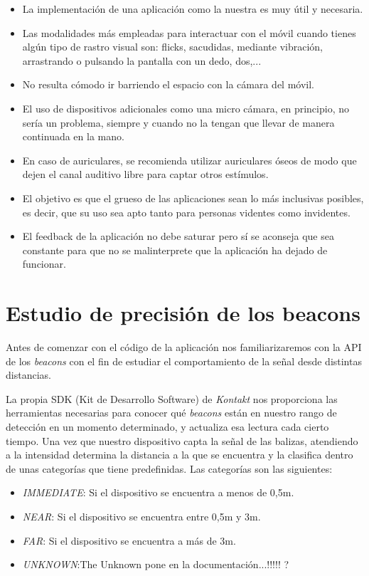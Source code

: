 \begin{itemize}
	\item La implementación de una aplicación como la nuestra es muy útil y necesaria.
	\item Las modalidades más empleadas para interactuar con el móvil cuando tienes algún tipo de rastro visual son: flicks, sacudidas, mediante vibración, arrastrando o pulsando la pantalla con un dedo, dos,...
	\item No resulta cómodo ir barriendo el espacio con la cámara del móvil.
	\item El uso de dispositivos adicionales como una micro cámara, en principio, no sería un problema, siempre y cuando no la tengan que llevar de manera continuada en la mano.
	\item En caso de auriculares, se recomienda utilizar auriculares óseos de modo que dejen el canal auditivo libre para captar otros estímulos.
	\item El objetivo es que el grueso de las aplicaciones sean lo más inclusivas posibles, es decir, que su uso sea apto tanto para personas videntes como invidentes.
	\item El feedback de la aplicación no debe saturar pero sí se aconseja que sea constante para que no se malinterprete que la aplicación ha dejado de funcionar.
\end{itemize}


\section{Estudio de precisión de los beacons}

Antes de comenzar con el código de la aplicación nos familiarizaremos con la API de los \textit{beacons} con el fin de estudiar el comportamiento de la señal desde distintas distancias.

La propia SDK (Kit de Desarrollo Software) de \textit{Kontakt} nos proporciona las herramientas necesarias para conocer qué \textit{beacons} están en nuestro rango de detección en un momento determinado, y actualiza esa lectura cada cierto tiempo. Una vez que nuestro dispositivo capta la señal de las balizas, atendiendo a la intensidad determina la distancia a la que se encuentra y la clasifica dentro de unas categorías que tiene predefinidas. Las categorías son las siguientes:

\begin{itemize}
	\item \textit{IMMEDIATE}: Si el dispositivo se encuentra a menos de 0,5m.
	\item \textit{NEAR}: Si el dispositivo se encuentra entre 0,5m y 3m.
	\item \textit{FAR}: Si el dispositivo se encuentra a más de 3m.
	\item \textit{UNKNOWN}:The Unknown pone en la documentación...!!!!! ?
\end{itemize}

